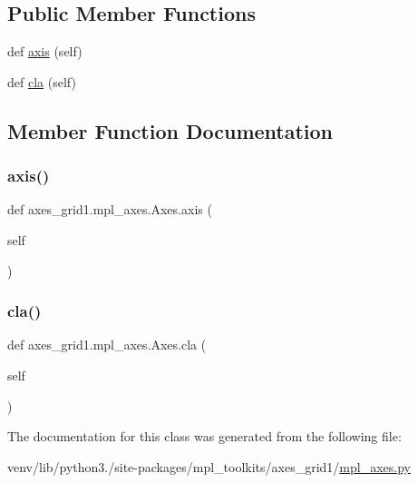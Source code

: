 \subsection*{Public Member Functions}
\begin{DoxyCompactItemize}
\item 
def \hyperlink{classaxes__grid1_1_1mpl__axes_1_1Axes_ac8de7b7f802a1705b7be3189a40b7178}{axis} (self)
\item 
def \hyperlink{classaxes__grid1_1_1mpl__axes_1_1Axes_a88a13c7d83d01f848b8f86121d581a94}{cla} (self)
\end{DoxyCompactItemize}


\subsection{Member Function Documentation}
\mbox{\label{classaxes__grid1_1_1mpl__axes_1_1Axes_ac8de7b7f802a1705b7be3189a40b7178}} 
\subsubsection{\texorpdfstring{axis()}{axis()}}
{\footnotesize\ttfamily def axes\+\_\+grid1.\+mpl\+\_\+axes.\+Axes.\+axis (\begin{DoxyParamCaption}\item[{}]{self }\end{DoxyParamCaption})}

\mbox{\label{classaxes__grid1_1_1mpl__axes_1_1Axes_a88a13c7d83d01f848b8f86121d581a94}} 
\subsubsection{\texorpdfstring{cla()}{cla()}}
{\footnotesize\ttfamily def axes\+\_\+grid1.\+mpl\+\_\+axes.\+Axes.\+cla (\begin{DoxyParamCaption}\item[{}]{self }\end{DoxyParamCaption})}



The documentation for this class was generated from the following file\+:\begin{DoxyCompactItemize}
\item 
venv/lib/python3./site-\/packages/mpl\+\_\+toolkits/axes\+\_\+grid1/\hyperlink{mpl__axes_8py}{mpl\+\_\+axes.\+py}\end{DoxyCompactItemize}
